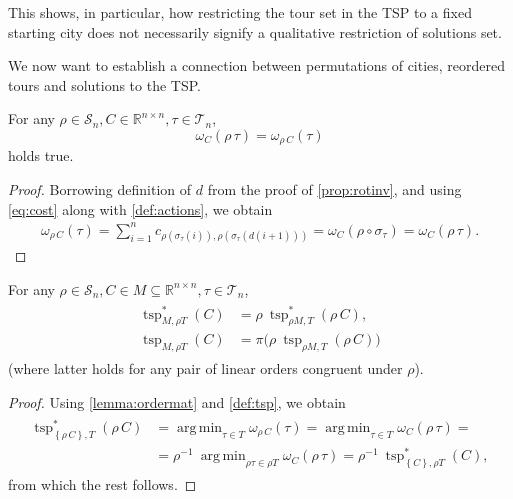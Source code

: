 \documentclass[titlepage,twoside,index=totoc,bibliography=totoc]{scrartcl}
\newcommand{\annotation}[1]{\marginpar{\small\itshape\color{green}#1}}
\DeclareMathOperator*{\argmin}{arg\,min}
\numberwithin{equation}{section}
\numberwithin{figure}{section}
\numberwithin{table}{section}
\begin{document}
This shows, in particular, how restricting the tour set in the TSP to a
fixed starting city does not necessarily signify a qualitative restriction
of solutions set.

We now want to establish a connection between permutations of cities,
reordered tours and solutions to the TSP.

\begin{lemma}
\label{lemma:ordermat}
  For any $\rho \in \mathcal{S}_n, C \in \mathbb{R}^{n \times n}, \tau \in \mathcal{T}_n$,
  \[
    \omega_C\left(\rho\,\tau\right) = \omega_{\rho\,C}\left(\tau\right)
  \]
  holds true.
\end{lemma}
\begin{proof}
  Borrowing definition of $d$ from the proof of \cref{prop:rotinv},
  and using \cref{eq:cost} along with \cref{def:actions}, we obtain
  \begin{align*}
    \omega_{\rho\,C}\left(\tau\right) =
    \sum_{i=1}^n c_{\rho\left(\sigma_\tau\left(i\right)\right),
                    \rho\left(\sigma_\tau\left(d\left(i+1\right)\right)\right)} =
    \omega_C\left(\rho \circ \sigma_\tau\right) =
    \omega_C\left(\rho\,\tau\right).
  \end{align*}
\end{proof}

\begin{corollary}
\label{cor:reorder}
  For any $\rho \in \mathcal{S}_n, C \in M \subseteq \mathbb{R}^{n \times n},
  \tau \in \mathcal{T}_n$,
  \begin{align*}
  \begin{split}
    \operatorname{tsp}^\ast_{M,\rho T}\left(C\right)
    & =
    \rho \: \operatorname{tsp}^\ast_{\rho M,T}\left(\rho\,C\right),
    \\
    \operatorname{tsp}_{M,\rho T}\left(C\right)
    & =
    \pi\big( \rho \: \operatorname{tsp}_{\rho M,T}\left(\rho\,C\right) \big)
  \end{split}
  \end{align*}
  (where latter holds for any pair of linear orders congruent under $\rho$).
\end{corollary}
\begin{proof}
  Using \cref{lemma:ordermat} and \cref{def:tsp}, we obtain
  \begin{align*}
    \begin{split}
    \operatorname{tsp}^\ast_{\left\{\rho\,C\right\},T}\left(\rho\,C\right)
    & =
    \argmin_{\tau \in T} \omega_{\rho\,C}\left(\tau\right) =
    \argmin_{\tau \in T} \omega_{C}\left(\rho\,\tau\right) =
    \\
    & =
    \rho^{-1} \: \argmin_{\rho\tau \in \rho T} \omega_{C}\left(\rho\,\tau\right) =
    \rho^{-1} \: \operatorname{tsp}^\ast_{\left\{C\right\},\rho T}\left(C\right),
    \end{split}
  \end{align*}
  from which the rest follows.
\end{proof}
\end{document}

